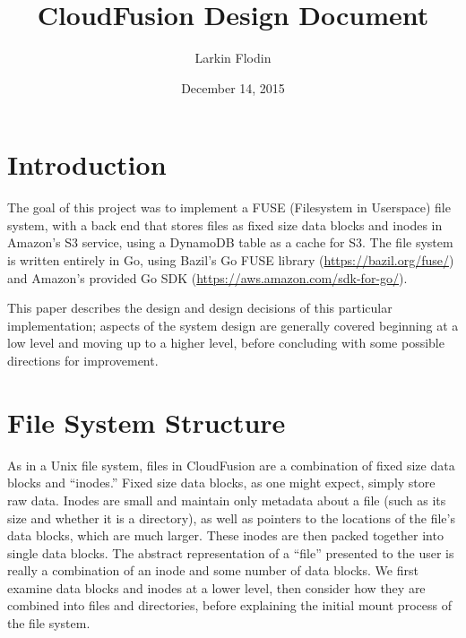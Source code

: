 \documentclass[11pt]{article}
\title{CloudFusion Design Document}
\author{Larkin Flodin}
\date{December 14, 2015}
\begin{document}
\maketitle

\section{Introduction}
The goal of this project was to implement a FUSE (Filesystem in Userspace) file system, with a back end that stores files as fixed size data blocks and inodes in Amazon's S3 service, using a DynamoDB table as a cache for S3. The file system is written entirely in Go, using Bazil's Go FUSE library (\url{https://bazil.org/fuse/}) and Amazon's provided Go SDK (\url{https://aws.amazon.com/sdk-for-go/}).

This paper describes the design and design decisions of this particular implementation; aspects of the system design are generally covered beginning at a low level and moving up to a higher level, before concluding with some possible directions for improvement.

\section{File System Structure}
As in a Unix file system, files in CloudFusion are a combination of fixed size data blocks and ``inodes.'' Fixed size data blocks, as one might expect, simply store raw data. Inodes are small and maintain only metadata about a file (such as its size and whether it is a directory), as well as pointers to the locations of the file's data blocks, which are much larger. These inodes are then packed together into single data blocks. The abstract representation of a ``file'' presented to the user is really a combination of an inode and some number of data blocks. We first examine data blocks and inodes at a lower level, then consider how they are combined into files and directories, before explaining the initial mount process of the file system.
\end{document}
